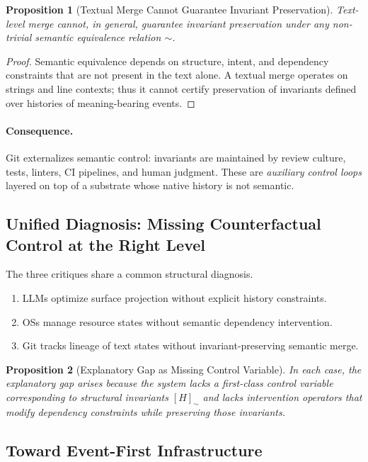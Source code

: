 \documentclass[11pt]{article}
\newtheorem{proposition}{Proposition}
\begin{document}
\begin{proposition}[Textual Merge Cannot Guarantee Invariant Preservation]
Text-level merge cannot, in general, guarantee invariant preservation under any non-trivial semantic equivalence relation $\sim$.
\end{proposition}

\begin{proof}
Semantic equivalence depends on structure, intent, and dependency constraints that are not present in the text alone. A textual merge operates on strings and line contexts; thus it cannot certify preservation of invariants defined over histories of meaning-bearing events.
\end{proof}

\paragraph{Consequence.}
Git externalizes semantic control: invariants are maintained by review culture, tests, linters, CI pipelines, and human judgment. These are \emph{auxiliary control loops} layered on top of a substrate whose native history is not semantic.

\subsection{Unified Diagnosis: Missing Counterfactual Control at the Right Level}

The three critiques share a common structural diagnosis.

\begin{enumerate}
  \item LLMs optimize surface projection without explicit history constraints.
  \item OSs manage resource states without semantic dependency intervention.
  \item Git tracks lineage of text states without invariant-preserving semantic merge.
\end{enumerate}

\begin{proposition}[Explanatory Gap as Missing Control Variable]
In each case, the explanatory gap arises because the system lacks a first-class \emph{control variable} corresponding to structural invariants $[H]_{\sim}$ and lacks intervention operators that modify dependency constraints while preserving those invariants.
\end{proposition}

\subsection{Toward Event-First Infrastructure}
\end{document}
